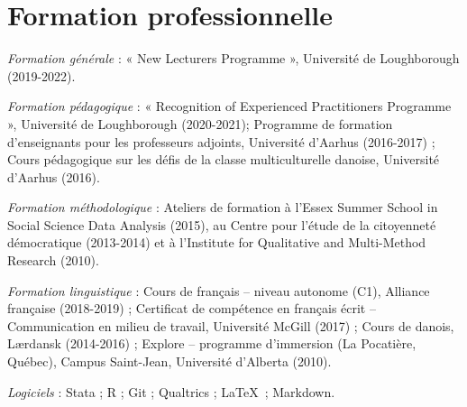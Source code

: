 \documentclass[letterpaper,fontsize=10.5pt]{scrartcl}
\begin{document}
\section{Formation professionnelle}
{}\textit{Formation générale} : « New Lecturers Programme », Université de Loughborough (2019-2022).\\
\hfill \break
{}
{}\textit{Formation pédagogique} : « Recognition of Experienced Practitioners Programme », Université de Loughborough (2020-2021); Programme de formation d'enseignants pour les professeurs adjoints, Université d'Aarhus (2016-2017) ; Cours pédagogique sur les défis de la classe multiculturelle danoise, Université d'Aarhus (2016).\\
\hfill \break
{}
{}\textit{Formation méthodologique} : Ateliers de formation à l'Essex Summer School in Social Science Data Analysis (2015), au Centre pour l’étude de la citoyenneté démocratique (2013-2014) et	à l'Institute for Qualitative and Multi-Method Research (2010).\\
\hfill \break
{}
{}\textit{Formation linguistique} : Cours de français – niveau autonome (C1), Alliance française (2018-2019) ; Certificat de compétence en français écrit – Communication en milieu de travail, Université McGill (2017) ; Cours de danois, Lærdansk (2014-2016) ; Explore – programme d'immersion (La Pocatière, Québec), Campus Saint-Jean, Université d'Alberta (2010).\\
\hfill \break
{}
{}\textit{Logiciels} : Stata ; R ; Git ; Qualtrics ; \LaTeX\ ; Markdown.

\end{document}
